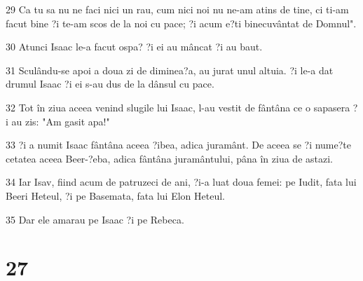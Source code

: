 \par 29 Ca tu sa nu ne faci nici un rau, cum nici noi nu ne-am atins de tine, ci ti-am facut bine ?i te-am scos de la noi cu pace; ?i acum e?ti binecuvântat de Domnul".
\par 30 Atunci Isaac le-a facut ospa? ?i ei au mâncat ?i au baut.
\par 31 Sculându-se apoi a doua zi de diminea?a, au jurat unul altuia. ?i le-a dat drumul Isaac ?i ei s-au dus de la dânsul cu pace.
\par 32 Tot în ziua aceea venind slugile lui Isaac, l-au vestit de fântâna ce o sapasera ?i au zis: "Am gasit apa!"
\par 33 ?i a numit Isaac fântâna aceea ?ibea, adica juramânt. De aceea se ?i nume?te cetatea aceea Beer-?eba, adica fântâna juramântului, pâna în ziua de astazi.
\par 34 Iar Isav, fiind acum de patruzeci de ani, ?i-a luat doua femei: pe Iudit, fata lui Beeri Heteul, ?i pe Basemata, fata lui Elon Heteul.
\par 35 Dar ele amarau pe Isaac ?i pe Rebeca.

\chapter{27}

